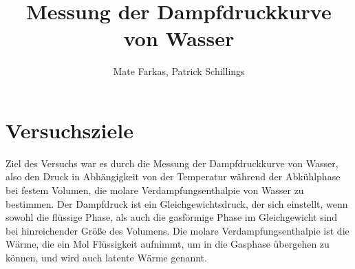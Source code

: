 \documentclass[]{article}
\title{Messung der Dampfdruckkurve von Wasser}
\date{}
\author{Mate Farkas, Patrick Schillings}
\begin{document}
	
	\maketitle
	
	\tableofcontents
	
	\noindent\makebox[\linewidth]{\rule{\textwidth}{0.4pt}}
	
	\section{Versuchsziele}
	Ziel des Versuchs war es durch die Messung der Dampfdruckkurve von Wasser, also den Druck in Abhängigkeit von der Temperatur während der Abkühlphase bei festem Volumen, die molare Verdampfungsenthalpie von Wasser zu bestimmen. Der Dampfdruck ist ein Gleichgewichtsdruck, der sich einstellt, wenn sowohl die flüssige Phase, als auch die gasförmige Phase im Gleichgewicht sind bei hinreichender Größe des Volumens. Die molare Verdampfungsenthalpie ist die Wärme, die ein Mol Flüssigkeit aufnimmt, um in die Gasphase übergehen zu können, und wird auch latente Wärme genannt.
\end{document}
